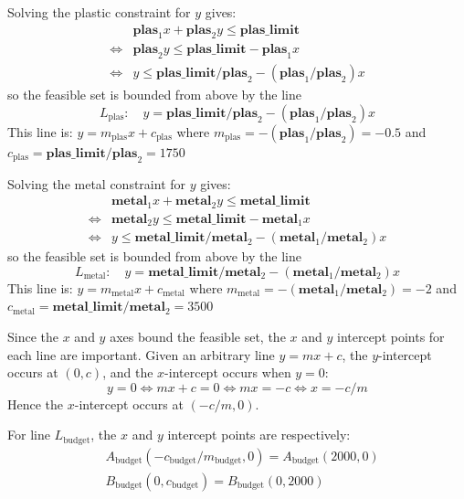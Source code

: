 \documentclass{article}
\begin{document}
\vspace{5mm}

Solving the plastic constraint for \(y\) gives:
\begin{align*}
& \textbf{plas}_1 x + \textbf{plas}_2 y \leq \textbf{plas\_limit} \\ 
\iff & \textbf{plas}_2 y \leq \textbf{plas\_limit} - \textbf{plas}_1 x \\
\iff & y \leq \textbf{plas\_limit}/\textbf{plas}_2 - (\textbf{plas}_1/\textbf{plas}_2)x
\end{align*}
so the feasible set is bounded from above by the line 
\[L_\text{plas} : \quad y = \textbf{plas\_limit}/\textbf{plas}_2 - (\textbf{plas}_1/\textbf{plas}_2)x\]
This line is: \(y = m_\text{plas}x + c_\text{plas}\) where \(m_\text{plas} =  -(\textbf{plas}_1/\textbf{plas}_2) = -0.5\) and \(c_\text{plas} = \textbf{plas\_limit}/\textbf{plas}_2 = 1750\)

\vspace{5mm}

Solving the metal constraint for \(y\) gives:
\begin{align*}
& \textbf{metal}_1 x + \textbf{metal}_2 y \leq \textbf{metal\_limit} \\ 
\iff & \textbf{metal}_2 y \leq \textbf{metal\_limit} - \textbf{metal}_1 x \\
\iff & y \leq \textbf{metal\_limit}/\textbf{metal}_2 - (\textbf{metal}_1/\textbf{metal}_2)x
\end{align*}
so the feasible set is bounded from above by the line 
\[L_\text{metal} : \quad y = \textbf{metal\_limit}/\textbf{metal}_2 - (\textbf{metal}_1/\textbf{metal}_2)x\]
This line is: \(y = m_\text{metal}x + c_\text{metal}\) where \(m_\text{metal} =  -(\textbf{metal}_1/\textbf{metal}_2) = -2\) and \(c_\text{metal} = \textbf{metal\_limit}/\textbf{metal}_2 = 3500\)

\vspace{5mm}

Since the \(x\) and \(y\) axes bound the feasible set, the \(x\) and \(y\) intercept points for each line are important. Given an arbitrary line \(y = mx + c\), the \(y\)-intercept occurs at \((0, c)\), and the \(x\)-intercept occurs when \(y = 0\):
\[y = 0 \iff mx + c = 0 \iff mx = -c \iff x = -c/m\]
Hence the \(x\)-intercept occurs at \((-c/m, 0)\). 

For line \(L_\text{budget}\), the \(x\) and \(y\) intercept points are respectively: 
\begin{align*}
& A_\text{budget}(-c_\text{budget}/m_\text{budget}, 0) = A_\text{budget}(2000, 0)\\
& B_\text{budget}(0, c_\text{budget}) = B_\text{budget}(0, 2000)
\end{align*}
\end{document}
